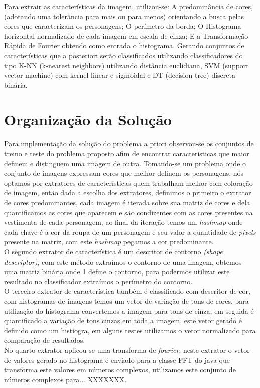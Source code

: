 \documentclass[12pt]{article}
\begin{document}
	Para extrair as características da imagem, utilizou-se: A predominância de cores, (adotando uma tolerância para mais ou para menos) orientando a busca pelas cores que caracterizam os personagens; O perímetro da borda; O Histograma horizontal normalizado de cada imagem em escala de cinza; E a Transformação Rápida de Fourier obtendo como entrada o histograma. Gerando conjuntos de características que a posteriori serão classificados utilizando classificadores do tipo K-NN (k-nearest neighbors) utilizando distância euclidiana, SVM (support vector machine) com kernel linear e sigmoidal e DT (decision tree) discreta binária.

\section{Organização da Solução}\label{sec:solucao}

	Para implementação da solução do problema a priori observou-se os conjuntos de treino e teste do problema proposto afim de encontrar características que maior definem e distinguem uma imagem de outra. Tomando-se um problema onde o conjunto de imagens expressam cores que melhor definem os personagens, nós optamos por extratores de características quem trabalham melhor com coloração de imagem, então dada a escolha dos extratores, definimos o primeiro o extrator de cores predominantes, cada imagem é iterada sobre sua matriz de cores e dela quantificamos as cores que aparecem e são condizentes com as cores presentes na vestimenta de cada personagem, ao final da iteração temos um \textit{hashmap} onde cada chave é a cor da roupa de um personagem e seu valor a quantidade de \textit{pixels} presente na matriz, com este \textit{hashmap} pegamos a cor predominante.\\
	O segundo extrator de característica é um descritor de contorno \textit{(shape descriptor)}, com este método extraímos o contorno de uma imagem, obtemos uma matriz binária onde 1 define o contorno, para podermos utilizar este resultado no classificador extraímos o perímetro do contorno. \\
	O terceiro extrator de característica também é classificado com descritor de cor, com histogramas de imagens temos um vetor de variação de tons de cores, para utilização do histograma convertemos a imagem para tons de cinza, em seguida é quantificado a variação de tons cinzas em toda a imagem, este vetor gerado é definido como um histiogra, em alguns testes utilizamos o vetor normalizado para comparação de resultados.\\
	No quarto extrator aplicou-se uma transforma de \textit{fourier}, neste extrator o vetor de valores gerado no histograma é enviado para a classe FFT do java que transforma este valores em números complexos, utilizamos este conjunto de números complexos para... XXXXXXX.\\
\end{document}
